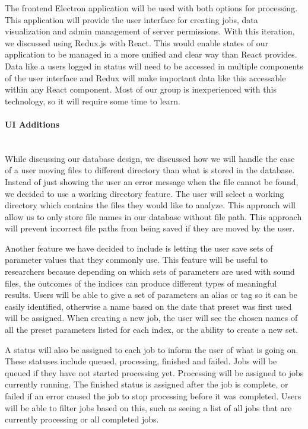 The frontend Electron application will be used with both options for processing. This application will provide the user interface for creating jobs, data visualization and admin management of server permissions. With this iteration, we discussed using Redux.js with React. This would enable states of our application to be managed in a more unified and clear way than React provides. Data like a user\textquotesingle s logged in status will need to be accessed in multiple components of the user interface and Redux will make important data like this accessable within any React component. Most of our group is inexperienced with this technology, so it will require some time to learn.\par

\paragraph{UI Additions} \mbox{}\\[\paragraphheaderspace]
While discussing our database design, we discussed how we will handle the case of a user moving files to different directory than what is stored in the database. Instead of just showing the user an error message when the file cannot be found, we decided to use a working directory feature. The user will select a working directory which contains the files they would like to analyze. This approach will allow us to only store file names in our database without file path. This approach will prevent incorrect file paths from being saved if they are moved by the user.\par
Another feature we have decided to include is letting the user save sets of parameter values that they commonly use. This feature will be useful to researchers because depending on which sets of parameters are used with sound files, the outcomes of the  indices can produce different types of meaningful results. Users will be able to give a set of parameters an alias or tag so it can be easily identified, otherwise a name based on the date that preset was first used will be assigned. When creating a new job, the user will see the chosen names of all the preset parameters listed for each index, or the ability to create a new set.\par
A status will also be assigned to each job to inform the user of what is going on. These statuses include queued, processing, finished and failed. Jobs will be queued if they have not started processing yet. Processing will be assigned to jobs currently running. The finished status is assigned after the job is complete, or failed if an error caused the job to stop processing before it was completed. Users will be able to filter jobs based on this, such as seeing a list of all jobs that are currently processing or all completed jobs.\par

